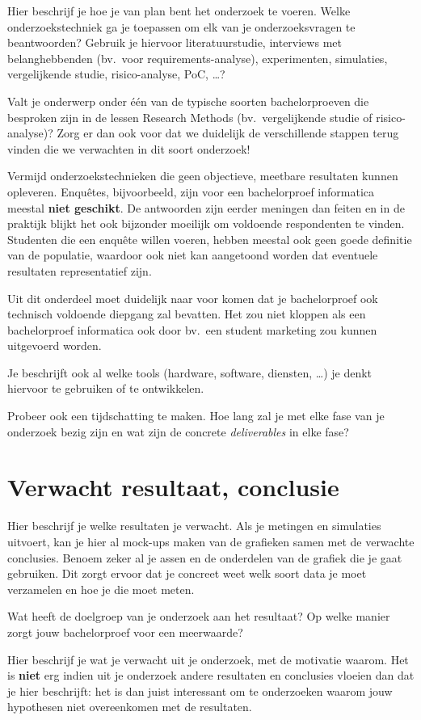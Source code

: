 Hier beschrijf je hoe je van plan bent het onderzoek te voeren. Welke onderzoekstechniek ga je toepassen om elk van je onderzoeksvragen te beantwoorden? 
Gebruik je hiervoor literatuurstudie, interviews met belanghebbenden (bv.~voor requirements-analyse), experimenten, simulaties, vergelijkende studie, risico-analyse, PoC, \ldots?

Valt je onderwerp onder één van de typische soorten bachelorproeven die besproken zijn in de lessen Research Methods (bv.\ vergelijkende studie of risico-analyse)? 
Zorg er dan ook voor dat we duidelijk de verschillende stappen terug vinden die we verwachten in dit soort onderzoek!

Vermijd onderzoekstechnieken die geen objectieve, meetbare resultaten kunnen opleveren. 
Enquêtes, bijvoorbeeld, zijn voor een bachelorproef informatica meestal \textbf{niet geschikt}. 
De antwoorden zijn eerder meningen dan feiten en in de praktijk blijkt het ook bijzonder moeilijk om voldoende respondenten te vinden. 
Studenten die een enquête willen voeren, hebben meestal ook geen goede definitie van de populatie, 
waardoor ook niet kan aangetoond worden dat eventuele resultaten representatief zijn.

Uit dit onderdeel moet duidelijk naar voor komen dat je bachelorproef ook technisch voldoen\-de diepgang zal bevatten. 
Het zou niet kloppen als een bachelorproef informatica ook door bv.\ een student marketing zou kunnen uitgevoerd worden.

Je beschrijft ook al welke tools (hardware, software, diensten, \ldots) je denkt hiervoor te gebruiken of te ontwikkelen.

Probeer ook een tijdschatting te maken. Hoe lang zal je met elke fase van je onderzoek bezig zijn en wat zijn de concrete \emph{deliverables} in elke fase?

\section{Verwacht resultaat, conclusie}%
\label{sec:verwachte_resultaten}

Hier beschrijf je welke resultaten je verwacht. Als je metingen en simulaties uitvoert, kan je hier al mock-ups maken van de grafieken samen met de verwachte conclusies. 
Benoem zeker al je assen en de onderdelen van de grafiek die je gaat gebruiken. 
Dit zorgt ervoor dat je concreet weet welk soort data je moet verzamelen en hoe je die moet meten.

Wat heeft de doelgroep van je onderzoek aan het resultaat? Op welke manier zorgt jouw bachelorproef voor een meerwaarde?

Hier beschrijf je wat je verwacht uit je onderzoek, met de motivatie waarom. Het is \textbf{niet} erg indien uit je onderzoek andere 
resultaten en conclusies vloeien dan dat je hier beschrijft: het is dan juist interessant om te 
onderzoeken waarom jouw hypothesen niet overeenkomen met de resultaten.

